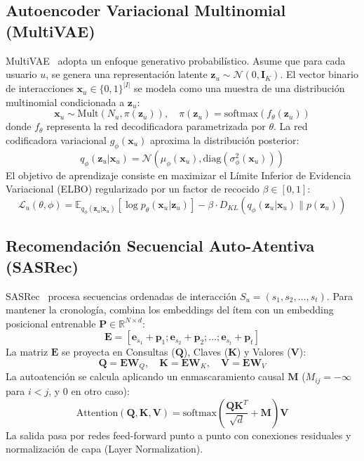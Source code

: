 \documentclass[journal]{IEEEtran}
\begin{document}
\subsection{Autoencoder Variacional Multinomial (MultiVAE)}
MultiVAE~\cite{liang2018variational} adopta un enfoque generativo probabilístico. Asume que para cada usuario $u$, se genera una representación latente $\mathbf{z}_u \sim \mathcal{N}(0, \mathbf{I}_K)$. El vector binario de interacciones $\mathbf{x}_u \in \{0, 1\}^{|I|}$ se modela como una muestra de una distribución multinomial condicionada a $\mathbf{z}_u$:
\begin{equation}
\mathbf{x}_u \sim \text{Mult}(N_u, \pi(\mathbf{z}_u)), \quad \pi(\mathbf{z}_u) = \text{softmax}(f_\theta(\mathbf{z}_u))
\end{equation}
donde $f_\theta$ representa la red decodificadora parametrizada por $\theta$. La red codificadora variacional $g_\phi(\mathbf{x}_u)$ aproxima la distribución posterior:
\begin{equation}
q_\phi(\mathbf{z}_u | \mathbf{x}_u) = \mathcal{N}(\mu_\phi(\mathbf{x}_u), \text{diag}(\sigma_\phi^2(\mathbf{x}_u)))
\end{equation}
El objetivo de aprendizaje consiste en maximizar el Límite Inferior de Evidencia Variacional (ELBO) regularizado por un factor de recocido $\beta \in [0, 1]$:
\begin{equation}
\mathcal{L}_u(\theta, \phi) = \mathbb{E}_{q_\phi(\mathbf{z}_u | \mathbf{x}_u)}[\log p_\theta(\mathbf{x}_u | \mathbf{z}_u)] - \beta \cdot D_{KL}(q_\phi(\mathbf{z}_u | \mathbf{x}_u) \parallel p(\mathbf{z}_u))
\end{equation}

\subsection{Recomendación Secuencial Auto-Atentiva (SASRec)}
SASRec~\cite{kang2018self} procesa secuencias ordenadas de interacción $S_u = (s_1, s_2, \dots, s_t)$. Para mantener la cronología, combina los embeddings del ítem con un embedding posicional entrenable $\mathbf{P} \in \mathbb{R}^{N \times d}$:
\begin{equation}
\mathbf{E} = [\mathbf{e}_{s_1} + \mathbf{p}_1; \mathbf{e}_{s_2} + \mathbf{p}_2; \dots; \mathbf{e}_{s_t} + \mathbf{p}_t]
\end{equation}
La matriz $\mathbf{E}$ se proyecta en Consultas ($\mathbf{Q}$), Claves ($\mathbf{K}$) y Valores ($\mathbf{V}$):
\begin{equation}
\mathbf{Q} = \mathbf{E}\mathbf{W}_Q, \quad \mathbf{K} = \mathbf{E}\mathbf{W}_K, \quad \mathbf{V} = \mathbf{E}\mathbf{W}_V
\end{equation}
La autoatención se calcula aplicando un enmascaramiento causal $\mathbf{M}$ ($M_{ij} = -\infty$ para $i < j$, y $0$ en otro caso):
\begin{equation}
\text{Attention}(\mathbf{Q}, \mathbf{K}, \mathbf{V}) = \text{softmax}\left(\frac{\mathbf{Q} \mathbf{K}^T}{\sqrt{d}} + \mathbf{M}\right) \mathbf{V}
\end{equation}
La salida pasa por redes feed-forward punto a punto con conexiones residuales y normalización de capa (Layer Normalization).
\end{document}
